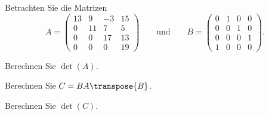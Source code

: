 Betrachten Sie die Matrizen
\[
A=\begin{pmatrix}
13& 9&-3&15\\
 0&11& 7& 5\\
 0& 0&17&13\\
 0& 0& 0&19
\end{pmatrix}
\qquad\text{und}\qquad
B
=
\begin{pmatrix}
0&1&0&0\\
0&0&1&0\\
0&0&0&1\\
1&0&0&0
\end{pmatrix}.
\]
\begin{teilaufgaben}
\item Berechnen Sie $\det(A)$.
\item Berechnen Sie $C=BA\transpose{B}$.
\item Berechnen Sie $\det(C)$.
\end{teilaufgaben}


